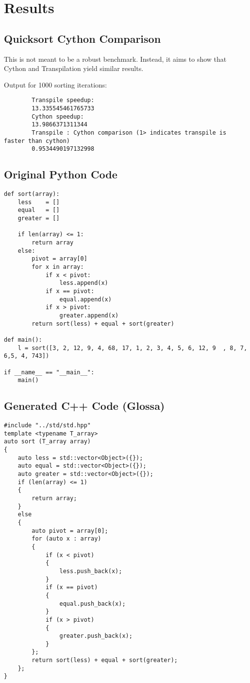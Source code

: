 \documentclass{article}
\begin{document}
\section{Results}
\subsection{Quicksort Cython Comparison}
This is not meant to be a robust benchmark. Instead, it aims to show that Cython and Transpilation yield similar results.

Output for 1000 sorting iterations:
\begin{center}
    \begin{verbatim}
        Transpile speedup:
        13.335545461765733
        Cython speedup:
        13.9866371311344
        Transpile : Cython comparison (1> indicates transpile is faster than cython)
        0.9534490197132998
    \end{verbatim}
\end{center}

\newpage
\subsection{Original Python Code}

\lstset{language=Python}
\begin{lstlisting}
def sort(array):
    less    = []
    equal   = []
    greater = []

    if len(array) <= 1:
        return array
    else:
        pivot = array[0]
        for x in array:
            if x < pivot:
                less.append(x)
            if x == pivot:
                equal.append(x)
            if x > pivot:
                greater.append(x)
        return sort(less) + equal + sort(greater)

def main():
    l = sort([3, 2, 12, 9, 4, 68, 17, 1, 2, 3, 4, 5, 6, 12, 9  , 8, 7, 6,5, 4, 743])

if __name__ == "__main__":
    main()
\end{lstlisting}

\lstset{language=C}

\newpage
\subsection{Generated C++ Code (Glossa)}

\begin{lstlisting}
#include "../std/std.hpp"
template <typename T_array>
auto sort (T_array array)
{
    auto less = std::vector<Object>({});
    auto equal = std::vector<Object>({});
    auto greater = std::vector<Object>({});
    if (len(array) <= 1)
    {
        return array;
    }
    else
    {
        auto pivot = array[0];
        for (auto x : array)
        {
            if (x < pivot)
            {
                less.push_back(x);
            }
            if (x == pivot)
            {
                equal.push_back(x);
            }
            if (x > pivot)
            {
                greater.push_back(x);
            }
        };
        return sort(less) + equal + sort(greater);
    };
}
\end{lstlisting}
\end{document}
